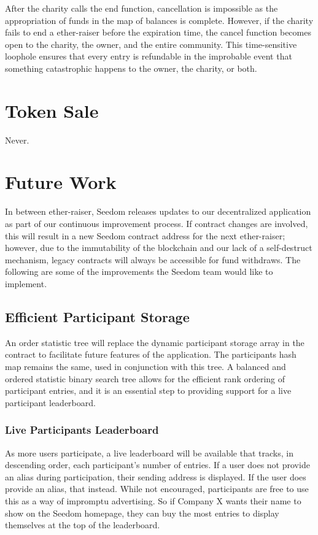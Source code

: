 \documentclass[11pt]{article}
\begin{document}
After the charity calls the end function, cancellation is impossible as the appropriation of funds in the map of balances is complete. However, if the charity fails to end a ether-raiser before the expiration time, the cancel function becomes open to the charity, the owner, and the entire community. This time-sensitive loophole ensures that every entry is refundable in the improbable event that something catastrophic happens to the owner, the charity, or both.

\section{Token Sale}
Never.

\section{Future Work}

In between ether-raiser, Seedom releases updates to our decentralized application as part of our continuous improvement process. If contract changes are involved, this will result in a new Seedom contract address for the next ether-raiser; however, due to the immutability of the blockchain and our lack of a self-destruct mechanism, legacy contracts will always be accessible for fund withdraws. The following are some of the improvements the Seedom team would like to implement.

\subsection{Efficient Participant Storage}

An order statistic tree \cite{5} will replace the dynamic participant storage array in the contract to facilitate future features of the application. The participants hash map remains the same, used in conjunction with this tree. A balanced and ordered statistic binary search tree allows for the efficient rank ordering of participant entries, and it is an essential step to providing support for a live participant leaderboard.

\subsubsection{Live Participants Leaderboard}

As more users participate, a live leaderboard will be available that tracks, in descending order, each participant's number of entries. If a user does not provide an alias during participation, their sending address is displayed. If the user does provide an alias, that instead. While not encouraged, participants are free to use this as a way of impromptu advertising. So if Company X wants their name to show on the Seedom homepage, they can buy the most entries to display themselves at the top of the leaderboard.
\end{document}
